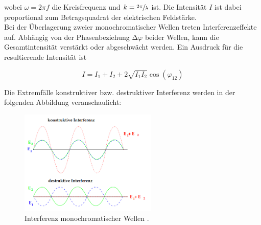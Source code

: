 \noindent wobei $\omega = 2\pi{}f$ die Kreisfrequenz und $k = \sfrac{2\pi}{\lambda}$ ist. Die Intensität $I$ ist dabei proportional 
zum Betragsquadrat der elektrischen Feldstärke.\\

\noindent Bei der Überlagerung zweier monochromatischer Wellen treten Interferenzeffekte auf. Abhängig von der Phasenbeziehung $\increment\varphi$
beider Wellen, kann die Gesamtintensität verstärkt oder abgeschwächt werden. Ein Ausdruck für die resultierende Intensität ist 

\begin{equation}
\label{eqn:Intensitaet}
    I = I_1 + I_2 + 2\sqrt{I_1I_2}\cos\left(\varphi_{12}\right)
\end{equation}

\noindent Die Extremfälle konstruktiver bzw. destruktiver Interferenz werden in der folgenden Abbildung veranschaulicht:

\begin{figure}
    \centering
    \includegraphics[height=5cm]{Interferenz.png}
    \caption{Interferenz monochromatischer Wellen \cite{Versuchsanleitung_v401}.}
    \label{fig:Interferenz}
\end{figure}

